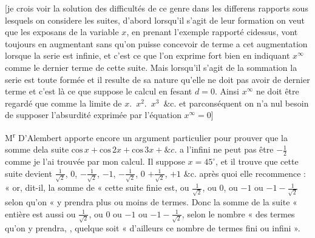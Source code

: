 \documentclass[11pt,a4paper]{article}
\begin{document}
[je crois voir la solution des difficultés de ce genre dans les differens rapports
sous lesquels on considere les suites, d'abord lorsqu'il s'agit de leur formation
on veut   que les exposans de la variable $x$, en prenant l'exemple
rapporté cidessus, vont toujours en augmentant sans qu'on puisse concevoir
de terme a cet augmentation lorsque la serie est infinie, et c'est ce
que l'on exprime fort bien en indiquant $x^{\infty}$ comme le dernier terme
de cette suite. Mais lorsqu'il s'agit de la sommation la serie est
toute formée et il resulte de sa nature qu'elle ne doit pas avoir de
dernier terme et c'est là ce que suppose le calcul en fesant $d=0$.
Ainsi $x^{\infty}$ ne doit être  regardé que comme la limite de $x$.~$x^{2}$.~$x^{3}$~\&c. et parconséquent
on n'a nul besoin de supposer l'absurdité exprimée par l'équation $x^{\infty}=0$]



M\textsuperscript{r} D'Alembert apporte encore un argument particulier pour prouver
que la somme dela suite $\text{cos}\,x+\text{cos}\,2x+\text{cos}\,3x+\&c.$ a l'infini ne
peut pas être $-\frac{1}{2}$ comme je l'ai trouvée par mon calcul. Il suppose
$x=45^{\circ}$, et il trouve que cette suite devient $\frac{1}{\sqrt{2}}$, $0$, $-\frac{1}{\sqrt{2}}$, $-1$, $-\frac{1}{\sqrt{2}}$, $0$
$+\frac{1}{\sqrt{2}}$, $+1$ \&c. après quoi elle recommence : « or, dit-il, la somme de
« cette suite finie est, ou $\frac{1}{\sqrt{2}}$, ou $0$, ou $-1$ ou $-1-\frac{1}{\sqrt{2}}$ selon qu'on
« y prendra plus ou moins de termes. Donc la somme de la suite
« entière est aussi ou $\frac{1}{\sqrt{2}}$, ou $0$ ou $-1$ ou $-1-\frac{1}{\sqrt{2}}$, selon le nombre
« des termes qu'on y prendra, , quelque soit
« d'ailleurs ce nombre de termes fini ou infini ». 
\end{document}
